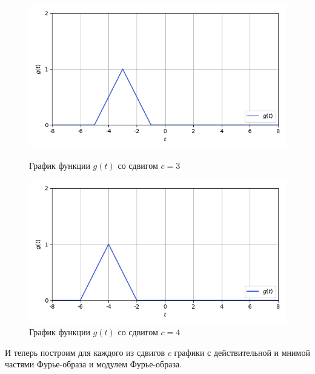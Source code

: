 \documentclass[a4paper]{article}
\begin{document}
\begin{figure}[H]
    \begin{minipage}{0.5\textwidth}
        \centering \includegraphics[width=\textwidth]{sources/6_complex/graph_3.png}
        \caption{График функции $g(t)$ со сдвигом $c = 3$} 
    \end{minipage}\hfill
    \begin{minipage}{0.5\textwidth}
        \centering \includegraphics[width=\textwidth]{sources/6_complex/graph_4.png}
        \caption{График функции $g(t)$ со сдвигом $c = 4$} 
    \end{minipage}
\end{figure}
\noindent И теперь построим для каждого из сдвигов $c$ графики с действительной и мнимой частями Фурье-образа и модулем Фурье-образа.
\end{document}
